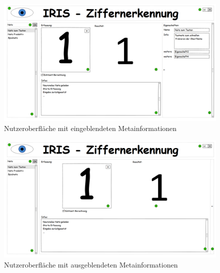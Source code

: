 \begin{figure}
 
 	\centering
 	\includegraphics[height=0.75\textwidth, angle=90]{Abbildungen/UI-Mocks/Main-Ui.png}
 	\caption{Nutzeroberfläche mit eingeblendeten Metainformationen}
 	\label{ui-max}
\end{figure}

\begin{figure}
	\centering
	\includegraphics[height=0.75\textwidth, angle=90]{Abbildungen/UI-Mocks/Main-Ui-Minimized.png}
	\caption{Nutzeroberfläche mit ausgeblendeten Metainformationen}
	\label{ui-min}
\end{figure}


